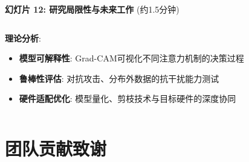 \documentclass[10pt]{beamer}
\begin{document}
\begin{frame}{\textbf{幻灯片 12: 研究局限性与未来工作} (约1.5分钟)}
\begin{columns}[T]
\begin{column}{0.5\textwidth}
{        \textbf{理论分析}:
        \begin{itemize}
            \item \textbf{模型可解释性}: Grad-CAM可视化不同注意力机制的决策过程
            \item \textbf{鲁棒性评估}: 对抗攻击、分布外数据的抗干扰能力测试
            \item \textbf{硬件适配优化}: 模型量化、剪枝技术与目标硬件的深度协同
        \end{itemize}}
    \end{column}
\end{columns}

\end{frame}

\section{团队贡献致谢}
\scriptsize
\end{document}

